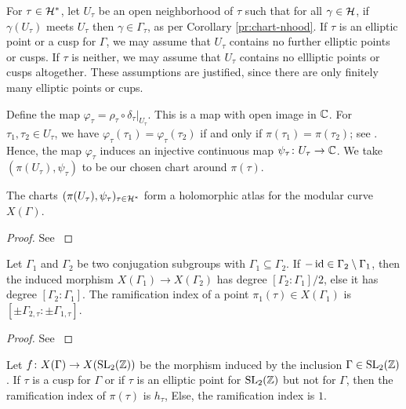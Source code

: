 For $\tau\in\mathcal{H}^*$, let $U_\tau$ be an open neighborhood of $\tau$ such that for all $\gamma\in\mathcal{H}$, if $\gamma(U_\tau)$ meets $U_\tau$ then $\gamma\in\Gamma_\tau$, as per Corollary \ref{pr:chart-nhood}. If $\tau$ is an elliptic point or a cusp for $\Gamma$, we may assume that $U_\tau$ contains no further elliptic points or cusps. If $\tau$ is neither, we may assume that $U_\tau$ contains no ellliptic points or cusps altogether. These assumptions are justified, since there are only finitely many elliptic points or cups.

Define the map $\varphi_\tau=\rho_\tau\circ\delta_\tau|_{U_\tau}$. This is a map with open image in $\mathbb{C}$. For $\tau_1,\tau_2\in U_\tau$, we have $\varphi_\tau(\tau_1)=\varphi_\tau(\tau_2)$ if and only if $\pi(\tau_1)=\pi(\tau_2)$; see \cite[p.\ 50, 60-61]{Diamond-Shurman}. Hence, the map $\varphi_\tau$ induces an injective continuous map $\psi_\tau\colon U_\tau\to\mathbb{C}$. We take $(\pi(U_\tau),\psi_\tau)$ to be our chosen chart around $\pi(\tau)$.

\begin{prop} \label{pr:charts}
 The charts $(\pi(U_\tau),\psi_\tau)_{\tau\in\mathcal{H}^*}$ form a holomorphic atlas for the modular curve $X(\Gamma)$.
\end{prop}

\begin{proof}
 See \cite[2.2, 2.4]{Diamond-Shurman}
\end{proof}


\begin{prop}
 Let $\Gamma_1$ and $\Gamma_2$ be two conjugation subgroups with $\Gamma_1\subseteq\Gamma_2$. If $-\operatorname{id}\in\Gamma_2\setminus\Gamma_1$, then the induced morphism $X(\Gamma_1)\to X(\Gamma_2)$ has degree $[\Gamma_2:\Gamma_1]/2$, else it has degree $[\Gamma_2:\Gamma_1]$. The ramification index of a point $\pi_1(\tau)\in X(\Gamma_1)$ is $[\pm\Gamma_{2,\tau}:\pm\Gamma_{1,\tau}]$.
\end{prop}

\begin{proof}
 See \cite[p.\ 66-67]{Diamond-Shurman}
\end{proof}

\begin{cor} \label{pr:ramification}
 Let $f\colon X(\Gamma)\to X(\operatorname{SL}_2(\mathbb{Z}))$ be the morphism induced by the inclusion $\Gamma\in\operatorname{SL}_2(\mathbb{Z})$. If $\tau$ is a cusp for $\Gamma$ or if $\tau$ is an elliptic point for $\operatorname{SL}_2(\mathbb{Z})$ but not for $\Gamma$, then the ramification index of $\pi(\tau)$ is $h_\tau$,  Else, the ramification index is $1$.
\end{cor}

